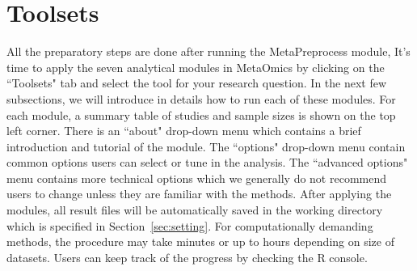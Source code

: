 \section{Toolsets}

All the preparatory steps are done after running the MetaPreprocess module,
It's time to apply the seven analytical modules in MetaOmics by clicking on the ``Toolsets" tab and select the tool for your research question.
In the next few subsections, 
we will introduce in details how to run each of these modules.
For each module, 
a summary table of studies and sample sizes is shown on the top left corner. 
There is an ``about" drop-down menu which contains a brief introduction and tutorial of the module.
The ``options" drop-down menu contain common options users can select or tune in the analysis.
The ``advanced options" menu contains more technical options which we generally do not recommend users to change unless they are familiar with the methods.
After applying the modules, 
all result files will be automatically saved in the working directory which is specified in Section~\ref{sec:setting}.
For computationally demanding methods, the procedure may take minutes or up to hours depending on size of datasets.
Users can keep track of the progress by checking the R console.






